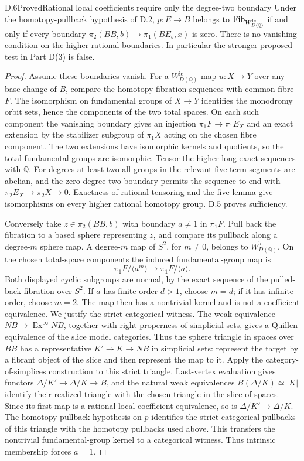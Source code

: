 \begin{claim}{D.6}{Proved}{Rational local coefficients require only the degree-two boundary}
Under the homotopy-pullback hypothesis of D.2, $p:E\to B$ belongs to $\mathrm{Fib}_{W_{D(\mathbb Q)}^{\mathrm{lc}}}$ if and only if every boundary $\pi_2(BB,b)\to\pi_1(BE_b,x)$ is zero. There is no vanishing condition on the higher rational boundaries. In particular the stronger proposed test in Part D(3) is false.
\end{claim}
\begin{proof}
Assume these boundaries vanish. For a $W_{D(\mathbb Q)}^{\mathrm{lc}}$-map $u:X\to Y$ over any base change of $B$, compare the homotopy fibration sequences with common fibre $F$. The isomorphism on fundamental groups of $X\to Y$ identifies the monodromy orbit sets, hence the components of the two total spaces. On each such component the vanishing boundary gives an injection $\pi_1F\to\pi_1E_X$ and an exact extension by the stabilizer subgroup of $\pi_1X$ acting on the chosen fibre component. The two extensions have isomorphic kernels and quotients, so the total fundamental groups are isomorphic. Tensor the higher long exact sequences with $\mathbb Q$. For degrees at least two all groups in the relevant five-term segments are abelian, and the zero degree-two boundary permits the sequence to end with $\pi_2E_X\to\pi_2X\to0$. Exactness of rational tensoring and the five lemma give isomorphisms on every higher rational homotopy group. D.5 proves sufficiency.

Conversely take $z\in\pi_2(BB,b)$ with boundary $a\ne1$ in $\pi_1F$. Pull back the fibration to a based sphere representing $z$, and compare its pullback along a degree-$m$ sphere map. A degree-$m$ map of $S^2$, for $m\ne0$, belongs to $W_{D(\mathbb Q)}^{\mathrm{lc}}$. On the chosen total-space components the induced fundamental-group map is
\[
 \pi_1F/\langle a^m\rangle\longrightarrow\pi_1F/\langle a\rangle.
\]
Both displayed cyclic subgroups are normal, by the exact sequence of the pulled-back fibration over $S^2$. If $a$ has finite order $d>1$, choose $m=d$; if it has infinite order, choose $m=2$. The map then has a nontrivial kernel and is not a coefficient equivalence. We justify the strict categorical witness. The weak equivalence $NB\to\operatorname{Ex}^{\infty}NB$, together with right properness of simplicial sets, gives a Quillen equivalence of the slice model categories. Thus the sphere triangle in spaces over $BB$ has a representative $K'\to K\to NB$ in simplicial sets: represent the target by a fibrant object of the slice and then represent the map to it. Apply the category-of-simplices construction to this strict triangle. Last-vertex evaluation gives functors $\Delta/K'\to\Delta/K\to B$, and the natural weak equivalences $B(\Delta/K)\simeq|K|$ identify their realized triangle with the chosen triangle in the slice of spaces. Since its first map is a rational local-coefficient equivalence, so is $\Delta/K'\to\Delta/K$. The homotopy-pullback hypothesis on $p$ identifies the strict categorical pullbacks of this triangle with the homotopy pullbacks used above. This transfers the nontrivial fundamental-group kernel to a categorical witness. Thus intrinsic membership forces $a=1$.


\end{proof}
